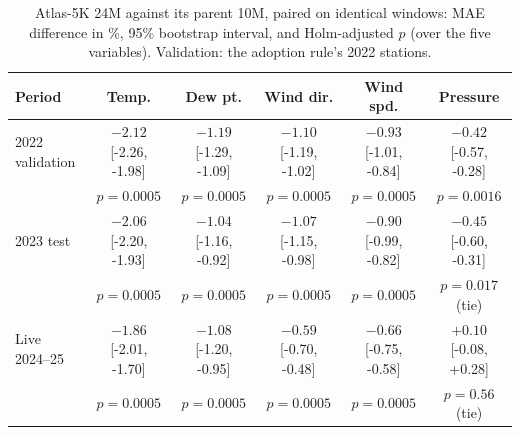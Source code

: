 \begin{table}[H]
\centering\scriptsize
\setlength{\tabcolsep}{3pt}
\caption{Atlas-5K 24M against its parent 10M, paired on identical windows: MAE difference in \%, 95\% bootstrap interval, and Holm-adjusted $p$ (over the five variables). Validation: the adoption rule's 2022 stations.}
\label{tab:vs10m}
\begin{tabular}{lccccc}
\toprule
Period & Temp. & Dew pt. & Wind dir. & Wind spd. & Pressure\\
\midrule
2022 validation & $-2.12$ [-2.26, -1.98] & $-1.19$ [-1.29, -1.09] & $-1.10$ [-1.19, -1.02] & $-0.93$ [-1.01, -0.84] & $-0.42$ [-0.57, -0.28]\\
 & $p=0.0005$ & $p=0.0005$ & $p=0.0005$ & $p=0.0005$ & $p=0.0016$\\[2pt]
2023 test & $-2.06$ [-2.20, -1.93] & $-1.04$ [-1.16, -0.92] & $-1.07$ [-1.15, -0.98] & $-0.90$ [-0.99, -0.82] & $-0.45$ [-0.60, -0.31]\\
 & $p=0.0005$ & $p=0.0005$ & $p=0.0005$ & $p=0.0005$ & $p=0.017$ (tie)\\[2pt]
Live 2024--25 & $-1.86$ [-2.01, -1.70] & $-1.08$ [-1.20, -0.95] & $-0.59$ [-0.70, -0.48] & $-0.66$ [-0.75, -0.58] & $+0.10$ [-0.08, +0.28]\\
 & $p=0.0005$ & $p=0.0005$ & $p=0.0005$ & $p=0.0005$ & $p=0.56$ (tie)\\[2pt]
\bottomrule
\end{tabular}
\end{table}
